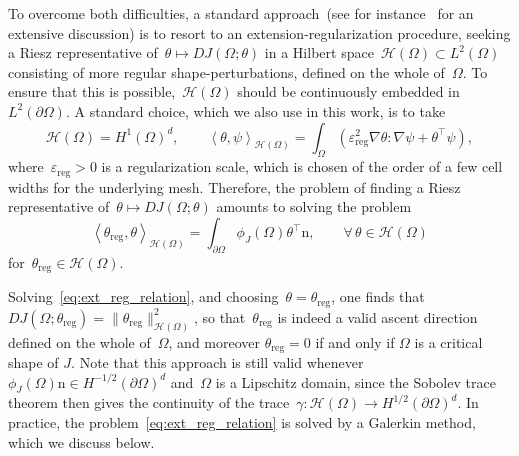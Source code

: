 \documentclass[a4]{article}
\newcommand{\n}{\mathrm{n}}
\newcommand{\reg}{\mathrm{reg}}
\newcommand{\1}{\mathbbm 1}
\begin{document}
To overcome both difficulties, a standard approach~(see for instance~\cite[Section 5.2.2]{ADJ21} for an extensive discussion) is to resort to an extension-regularization procedure, seeking a Riesz representative of~$\theta \mapsto D J(\Omega;\theta)$ in a Hilbert space~$\mathcal H(\Omega)\subset L^2(\Omega)$ consisting of more regular shape-perturbations, defined on the whole of~$\Omega$.
To ensure that this is possible,~$\mathcal H(\Omega)$ should be continuously embedded in~$L^2(\partial\Omega)$. 
A standard choice, which we also use in this work, is to take
\begin{equation}
    \label{eq:ext_reg_space}
    \mathcal H(\Omega) = H^1(\Omega)^d,\qquad \left\langle\theta,\psi\right\rangle_{\mathcal H(\Omega)} = \int_{\Omega} \left(\varepsilon_\reg^2\nabla\theta :\nabla\psi + \theta^\top\psi\right),
\end{equation}
where~$\varepsilon_\reg>0$ is a regularization scale, which is chosen of the order of a few cell widths for the underlying mesh. Therefore, the problem of finding a Riesz representative of~$\theta\mapsto DJ(\Omega;\theta)$ amounts to solving the problem
\begin{equation}
    \label{eq:ext_reg_relation}
    \left\langle \theta_\reg,\theta\right\rangle_{\mathcal H(\Omega)} = \int_{\partial\Omega}\phi_J(\Omega)\theta^\top\n,\qquad\forall\,\theta\in \mathcal H(\Omega)
\end{equation}
for~$\theta_\reg\in \mathcal H(\Omega)$.

Solving~\eqref{eq:ext_reg_relation}, and choosing~$\theta=\theta_\reg$, one finds that~$DJ(\Omega;\theta_\reg)=\|\theta_\reg\|_{\mathcal H(\Omega)}^2$, so that~$\theta_\reg$ is indeed a valid ascent direction defined on the whole of~$\Omega$, and moreover $\theta_\reg=0$ if and only if $\Omega$ is a critical shape of $J$. Note that this approach is still valid whenever~$\phi_J(\Omega)\n\in H^{-1/2}(\partial\Omega)^d$ and~$\Omega$ is a Lipschitz domain, since the Sobolev trace theorem then gives the continuity of the trace~$\gamma:\mathcal H(\Omega)\to H^{1/2}(\partial\Omega)^d$. In practice, the problem~\eqref{eq:ext_reg_relation} is solved by a Galerkin method, which we discuss below.
\end{document}
